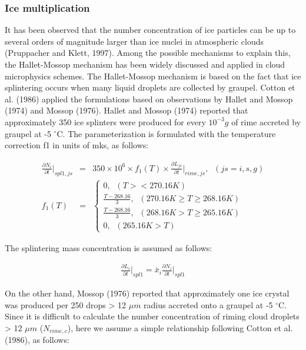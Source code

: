 \subsubsection{Ice multiplication}
It has been observed that the number concentration of ice particles can be up to several orders of magnitude larger than ice nuclei in atmospheric clouds (Pruppacher and Klett, 1997). Among the possible mechanisms to explain this, the Hallet-Mossop mechanism has been widely discussed and applied in cloud microphysics schemes. The Hallet-Mossop mechanism is based on the fact that ice splintering occurs when many liquid droplets are collected by graupel. Cotton et al. (1986) applied the formulations based on observations by Hallet and Mossop (1974) and Mossop (1976).
Hallet and Mossop (1974) reported that approximately 350 ice splinters were produced for every $10^{-3} g$ of rime accreted by graupel at -5 $^\circ$C. The parameterization is formulated with the temperature correction f1 in units of mks, as follows:

\begin{eqnarray}
\frac{\partial N_{i}}{\partial t}\Bigr|_{spl1,js}&=&350\times 10^{6}\times f_{1}(T)\times\frac{\partial L_{js}}{\partial t}\Bigr|_{rime,js},\;\;(js=i,s,g)\label{sn212}\\
f_{1}(T)&=&
\left\{
\begin{array}{l}
0,\;\;(T><270.16K) \\
\frac{T-268.16}{3},\;\;(270.16K \geq T \geq 268.16K) \\
\frac{T-268.16}{3},\;\;(268.16K > T \geq 265.16K) \\
0,\;\;(265.16K>T)
\label{sn213}
\end{array}
\right.
\end{eqnarray}

The splintering mass concentration is assumed as follows:

\begin{eqnarray}
\frac{\partial L_{i}}{\partial t}\Bigr|_{spl1}=\bar{x}_{i}\frac{\partial N_{i}}{\partial t}\Bigr|_{spl1}\label{sn214}
\end{eqnarray}

On the other hand, Mossop (1976) reported that approximately one ice crystal was produced per 250 drops > 12 $\mu m$ radius accreted onto a graupel at -5 $^\circ$C. Since it is difficult to calculate the number concentration of riming cloud droplets > 12 $\mu m$ ($N_{rime,c}$), here we assume a simple relationship following Cotton et al. (1986), as follows:

